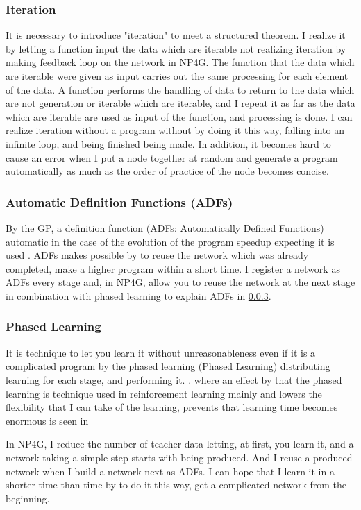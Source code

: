 \documentclass{article}
\begin{document}
\subsubsection {Iteration}
It is necessary to introduce "iteration" to meet a structured theorem.
I realize it by letting a function input the data which are iterable not realizing iteration by making feedback loop on the network in NP4G.
The function that the data which are iterable were given as input carries out the same processing for each element of the data.
A function performs the handling of data to return to the data which are not generation or iterable which are iterable, and I repeat it as far as the data which are iterable are used as input of the function, and processing is done.
I can realize iteration without a program without by doing it this way, falling into an infinite loop, and being finished being made.
In addition, it becomes hard to cause an error when I put a node together at random and generate a program automatically as much as the order of practice of the node becomes concise.

\subsubsection {Automatic Definition Functions (ADFs)}
By the GP, a definition function (ADFs: Automatically Defined Functions) automatic in the case of the evolution of the program speedup expecting it is used \cite{adfs}.
ADFs makes possible by to reuse the network which was already completed, make a higher program within a short time.
I register a network as ADFs every stage and, in NP4G, allow you to reuse the network at the next stage in combination with phased learning to explain ADFs in \ref{sec:PL}.

\subsubsection {Phased Learning}
\label{sec:PL}
It is technique to let you learn it without unreasonableness even if it is a complicated program by the phased learning (Phased Learning) distributing learning for each stage, and performing it.
\cite{hodohara2012reinforcement}. where an effect by that the phased learning is technique used in reinforcement learning mainly and lowers the flexibility that I can take of the learning, prevents that learning time becomes enormous is seen in

In NP4G, I reduce the number of teacher data letting, at first, you learn it, and a network taking a simple step starts with being produced.
And I reuse a produced network when I build a network next as ADFs.
I can hope that I learn it in a shorter time than time by to do it this way, get a complicated network from the beginning.
\end{document}
